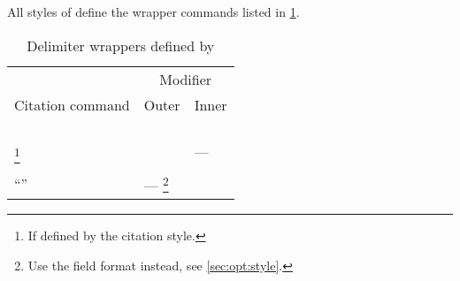 \documentclass[DIV=9]{scrartcl}
\begin{document}
\begin{ltxsyntax}
All styles of  define the wrapper commands listed in
\cref{tab:delimwrappers}.
\begin{table}[btph]
\centering
\caption{Delimiter wrappers defined by }
\label{tab:delimwrappers}
\begin{minipage}{\linewidth}
\renewcommand\footnoterule{}
\centering
\begin{tabular}{@{}lll@{}}
\toprule
                 & \multicolumn{2}{c}{Modifier} \\
                 \cmidrule(lr){2-3}
Citation command & Outer & Inner\\
\midrule
\cmd{cite} & \cmd{mkoutercitedelims} & \cmd{mkinnercitedelims}\\
\cmd{parencite} & \cmd{mkouterparencitedelims} & \cmd{mkinnerparencitedelims}\\
\cmd{textcite} & \cmd{mkoutertextcitedelims} & \cmd{mkinnertextcitedelims}\\
\cmd{footcite} & \cmd{mkouterfootcitedelims} & \cmd{mkinnerfootcitedelims}\\
\cmd{supercite}\footnote{If defined by the citation style.}
 & \cmd{mkoutersupercitedelims} & ---\\
\cmd{bbx@xrefcite} & \cmd{mkouterbbx@xrefcitedelims} &
  \cmd{mkinnerbbx@xrefcitedelims}\\
\enquote{\cmd{bbx@introcite}} & ---%
    \footnote{Use the field format \bibfieldformat{bbx@introcite} instead,
      see \cref{sec:opt:style}.} & \cmd{mkinnerbbx@introcitedelims}\\
\bottomrule
\end{tabular}
\end{minipage}
\end{table}



\end{ltxsyntax}
\end{document}
